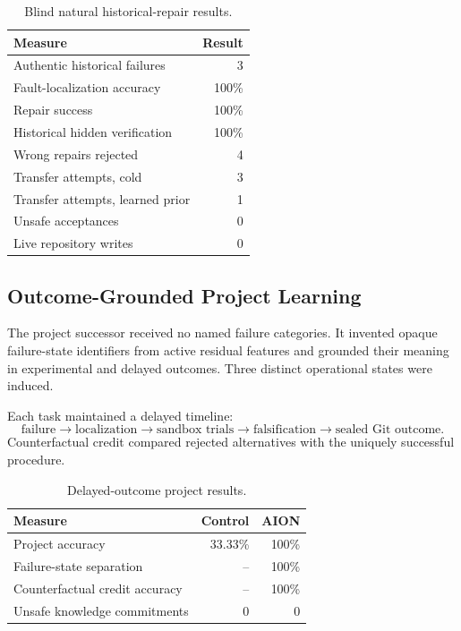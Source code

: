 \begin{table}[htbp]
\centering
\begin{tabular}{lr}
\hline
\textbf{Measure} & \textbf{Result}\\
\hline
Authentic historical failures & 3\\
Fault-localization accuracy & 100\%\\
Repair success & 100\%\\
Historical hidden verification & 100\%\\
Wrong repairs rejected & 4\\
Transfer attempts, cold & 3\\
Transfer attempts, learned prior & 1\\
Unsafe acceptances & 0\\
Live repository writes & 0\\
\hline
\end{tabular}
\caption{Blind natural historical-repair results.}
\end{table}

\subsection{Outcome-Grounded Project Learning}

The project successor received no named failure categories. It invented opaque
failure-state identifiers from active residual features and grounded their
meaning in experimental and delayed outcomes. Three distinct operational
states were induced.

Each task maintained a delayed timeline:
\[
\text{failure}
\rightarrow \text{localization}
\rightarrow \text{sandbox trials}
\rightarrow \text{falsification}
\rightarrow \text{sealed Git outcome}.
\]
Counterfactual credit compared rejected alternatives with the uniquely
successful procedure.

\begin{table}[htbp]
\centering
\begin{tabular}{lrr}
\hline
\textbf{Measure} & \textbf{Control} & \textbf{AION}\\
\hline
Project accuracy & 33.33\% & 100\%\\
Failure-state separation & -- & 100\%\\
Counterfactual credit accuracy & -- & 100\%\\
Unsafe knowledge commitments & 0 & 0\\
\hline
\end{tabular}
\caption{Delayed-outcome project results.}
\end{table}

